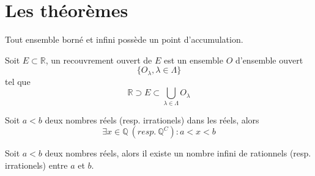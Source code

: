 \section{Les théorèmes}
	\begin{mythm}
		Tout ensemble borné et infini possède un point d'accumulation.
	\end{mythm}
	\begin{mythm}
		Soit $E\subset\mathbb{R}$, un recouvrement ouvert de $E$ est un ensemble $O$ d'ensemble ouvert \[\{O_{\lambda}, \lambda\in\Lambda\}\] tel que \[\mathbb{R}\supset E\subset \bigcup_{\lambda\in\Lambda}O_{\lambda}\]
	\end{mythm}
	\begin{mythm}
		Soit $a<b$ deux nombres réels (resp. irrationels) dans les réels, alors
		\[\exists x\in\mathbb{Q}~(resp.~\mathbb{Q}^C) : a<x<b\]
	\end{mythm}
	\begin{mythm}[Corolaire]
		Soit $a<b$ deux nombres réels, alors il existe un nombre infini de rationnels (resp. irrationels) entre $a$ et $b$.
	\end{mythm}